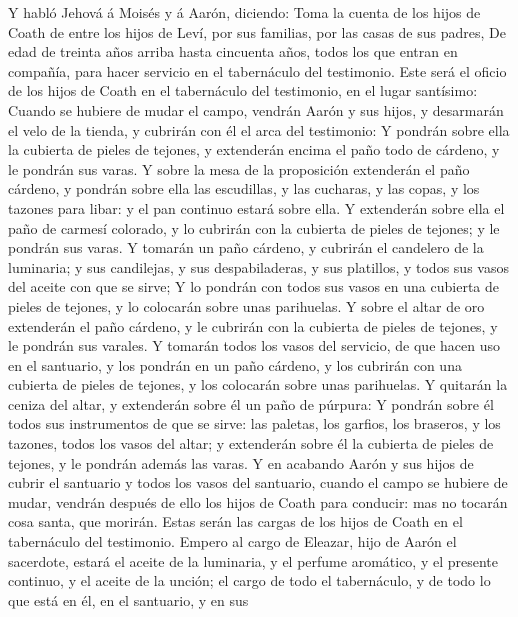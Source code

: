  Y habló Jehová á Moisés y á Aarón, diciendo: 
Toma la cuenta de los hijos de Coath de entre los hijos de Leví, por sus
familias, por las casas de sus padres,  De edad de treinta
años arriba hasta cincuenta años, todos los que entran en compañía, para
hacer servicio en el tabernáculo del testimonio.  Este será
el oficio de los hijos de Coath en el tabernáculo del testimonio, en el
lugar santísimo:  Cuando se hubiere de mudar el campo,
vendrán Aarón y sus hijos, y desarmarán el velo de la tienda, y cubrirán
con él el arca del testimonio:  Y pondrán sobre ella la
cubierta de pieles de tejones, y extenderán encima el paño todo de
cárdeno, y le pondrán sus varas.  Y sobre la mesa de la
proposición extenderán el paño cárdeno, y pondrán sobre ella las
escudillas, y las cucharas, y las copas, y los tazones para libar: y el
pan continuo estará sobre ella.  Y extenderán sobre ella el
paño de carmesí colorado, y lo cubrirán con la cubierta de pieles de
tejones; y le pondrán sus varas.  Y tomarán un paño cárdeno,
y cubrirán el candelero de la luminaria; y sus candilejas, y sus
despabiladeras, y sus platillos, y todos sus vasos del aceite con que se
sirve;  Y lo pondrán con todos sus vasos en una cubierta de
pieles de tejones, y lo colocarán sobre unas parihuelas.  Y
sobre el altar de oro extenderán el paño cárdeno, y le cubrirán con la
cubierta de pieles de tejones, y le pondrán sus varales.  Y
tomarán todos los vasos del servicio, de que hacen uso en el santuario,
y los pondrán en un paño cárdeno, y los cubrirán con una cubierta de
pieles de tejones, y los colocarán sobre unas parihuelas. 
Y quitarán la ceniza del altar, y extenderán sobre él un paño de
púrpura:  Y pondrán sobre él todos sus instrumentos de que
se sirve: las paletas, los garfios, los braseros, y los tazones, todos
los vasos del altar; y extenderán sobre él la cubierta de pieles de
tejones, y le pondrán además las varas.  Y en acabando
Aarón y sus hijos de cubrir el santuario y todos los vasos del
santuario, cuando el campo se hubiere de mudar, vendrán después de ello
los hijos de Coath para conducir: mas no tocarán cosa santa, que
morirán. Estas serán las cargas de los hijos de Coath en el tabernáculo
del testimonio.  Empero al cargo de Eleazar, hijo de Aarón
el sacerdote, estará el aceite de la luminaria, y el perfume aromático,
y el presente continuo, y el aceite de la unción; el cargo de todo el
tabernáculo, y de todo lo que está en él, en el santuario, y en sus
